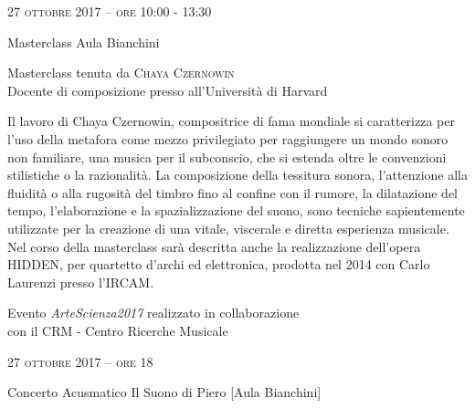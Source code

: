
\begin{flushright}

\large{
	\scshape{
	27 ottobre 2017 -- ore 10:00 - 13:30
	}}

\medskip
	
\small{Masterclass
	\newline Aula Bianchini}

\medskip

{\fontsize{20}{20} }

\normalfont

\normalsize

\bigskip

Masterclass tenuta da \textsc{Chaya Czernowin}\\{\footnotesize Docente di composizione presso all'Università di Harvard}


\bigskip

Il lavoro di Chaya Czernowin, compositrice di fama mondiale si caratterizza per l’uso della metafora come mezzo privilegiato per raggiungere un mondo sonoro non familiare, una musica per il subconscio, che si estenda oltre le convenzioni stilistiche o la razionalità. La composizione della tessitura sonora, l’attenzione alla fluidità o alla rugosità del timbro fino al confine con il rumore, la dilatazione del tempo, l’elaborazione e la spazializzazione del suono, sono tecniche sapientemente utilizzate per la creazione di una vitale, viscerale e diretta esperienza musicale. Nel corso della masterclass sarà descritta anche la realizzazione dell’opera HIDDEN, per quartetto d’archi ed elettronica, prodotta nel 2014 con Carlo Laurenzi presso l’IRCAM.

\bigskip

\small{Evento \textit{ArteScienza2017} realizzato in collaborazione\\con il CRM - Centro Ricerche Musicale}

\vfill

\large{
	\scshape{
	27 ottobre 2017 -- ore 18
	}}

\medskip

\small{Concerto Acusmatico
	\newline Il Suono di Piero [Aula Bianchini]}

\medskip


{\fontsize{20}{20} }


\end{flushright}
